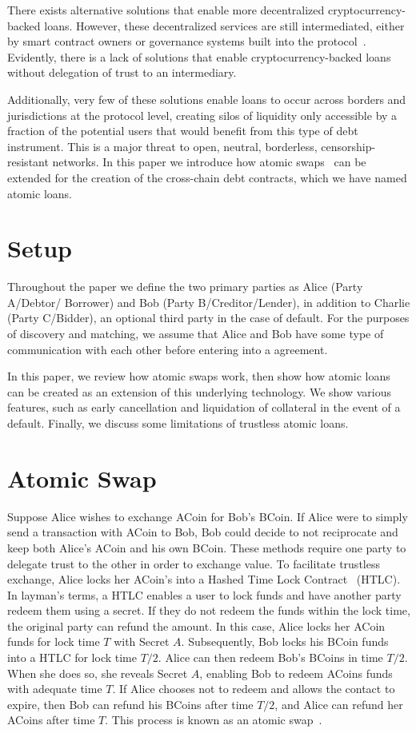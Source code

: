 \documentclass{llncs}
\begin{document}
There exists alternative solutions that enable more decentralized cryptocurrency-backed loans. However, these decentralized services are still intermediated, either by smart contract owners or governance systems built into the protocol~\cite{ref_article7}. Evidently, there is a lack of solutions that enable cryptocurrency-backed loans without delegation of trust to an intermediary. 

Additionally, very few of these solutions enable loans to occur across borders and jurisdictions at the protocol level, creating silos of liquidity only accessible by a fraction of the potential users that would benefit from this type of debt instrument. This is a major threat to open, neutral, borderless, censorship-resistant networks. In this paper we introduce how atomic swaps~\cite{ref_article8} can be extended for the creation of the cross-chain debt contracts, which we have named atomic loans.  

\section{Setup}

Throughout the paper we define the two primary parties as Alice (Party A/Debtor/ Borrower) and Bob (Party B/Creditor/Lender), in addition to Charlie (Party C/Bidder), an optional third party in the case of default. For the purposes of discovery and matching, we assume that Alice and Bob have some type of communication with each other before entering into a agreement.

In this paper, we review how atomic swaps work, then show how atomic loans can be created as an extension of this underlying technology. We show various features, such as early cancellation and liquidation of collateral in the event of a default. Finally, we discuss some limitations of trustless atomic loans. 

\section{Atomic Swap}

Suppose Alice wishes to exchange ACoin for Bob’s BCoin. If Alice were to simply send a transaction with ACoin to Bob, Bob could decide to not reciprocate and keep both Alice's ACoin and his own BCoin. These methods require one party to delegate trust to the other in order to exchange value. To facilitate trustless exchange, Alice locks her ACoin's into a Hashed Time Lock Contract~\cite{ref_article9} (HTLC). In layman's terms, a HTLC enables a user to lock funds and have another party redeem them using a secret. If they do not redeem the funds within the lock time, the original party can refund the amount. In this case, Alice locks her ACoin funds for lock time $T$ with Secret $A$. Subsequently, Bob locks his BCoin funds into a HTLC for lock time $T / 2$. Alice can then redeem Bob’s BCoins in time $T / 2$. When she does so, she reveals Secret $A$, enabling Bob to redeem ACoins funds with adequate time $T$. If Alice chooses not to redeem and allows the contact to expire, then Bob can refund his BCoins after time $T / 2$, and Alice can refund her ACoins after time $T$. This process is known as an atomic swap~\cite{ref_article8}.
\end{document}
